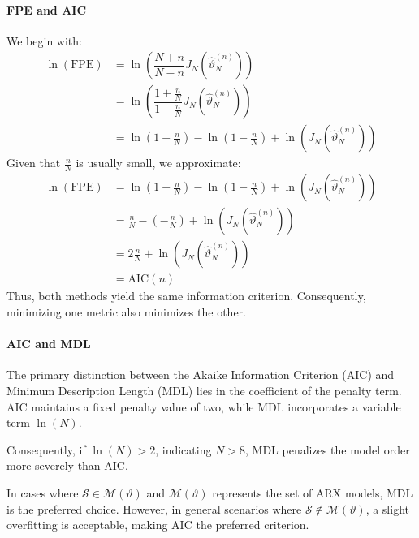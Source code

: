 \paragraph*{FPE and AIC}
We begin with:
\begin{align*}
    \ln(\text{FPE}) &= \ln\left( \dfrac{N+n}{N-n}J_N\left(\hat{\vartheta}_N^{(n)}\right) \right) \\
                    &= \ln\left( \dfrac{1+\frac{n}{N}}{1-\frac{n}{N}}J_N\left(\hat{\vartheta}_N^{(n)}\right)\right) \\
                    &= \ln\left(1+\frac{n}{N}\right) - \ln\left(1-\frac{n}{N}\right) + \ln\left(J_N\left(\hat{\vartheta}_N^{(n)}\right)\right)
\end{align*}
Given that $\frac{n}{N}$ is usually small, we approximate:
\begin{align*}
    \ln(\text{FPE}) &= \ln\left(1+\frac{n}{N}\right) - \ln\left(1-\frac{n}{N}\right) + \ln\left(J_N\left(\hat{\vartheta}_N^{(n)}\right)\right) \\
                    &= \frac{n}{N} - \left(-\frac{n}{N}\right) + \ln\left(J_N\left(\hat{\vartheta}_N^{(n)}\right)\right) \\
                    &= 2\frac{n}{N} + \ln\left(J_N\left(\hat{\vartheta}_N^{(n)}\right)\right) \\
                    &= \text{AIC}(n)
\end{align*}
Thus, both methods yield the same information criterion. 
Consequently, minimizing one metric also minimizes the other.

\paragraph*{AIC and MDL}
The primary distinction between the Akaike Information Criterion (AIC) and Minimum Description Length (MDL) lies in the coefficient of the penalty term. 
AIC maintains a fixed penalty value of two, while MDL incorporates a variable term $\ln(N)$.

Consequently, if $\ln(N) > 2$, indicating $N > 8$, MDL penalizes the model order more severely than AIC.

In cases where $\mathcal{S} \in \mathcal{M}(\vartheta)$ and $\mathcal{M}(\vartheta)$ represents the set of ARX models, MDL is the preferred choice. 
However, in general scenarios where $\mathcal{S} \notin \mathcal{M}(\vartheta)$, a slight overfitting is acceptable, making AIC the preferred criterion.